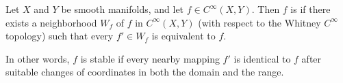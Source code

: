 Let $X$ and $Y$ be smooth manifolds, and let $f \in C^\infty(X, Y)$. Then $f$ is  if there exists a neighborhood $W_f$ of $f$ in $C^\infty(X, Y)$ (with respect to the Whitney $C^\infty$ topology) such that every $f' \in W_f$ is equivalent to $f$.

In other words, $f$ is stable if every nearby mapping $f'$ is identical to $f$ after suitable changes of coordinates in both the domain and the range.

